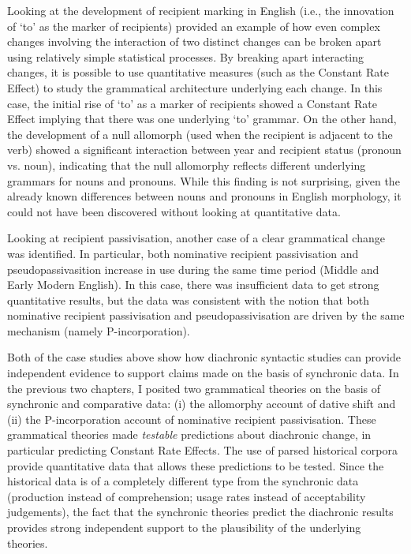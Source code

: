 	Looking at the development of recipient marking in English (i.e., the innovation of `to' as the marker of recipients) provided an example of how even complex changes involving the interaction of two distinct changes can be broken apart using relatively simple statistical processes. By breaking apart interacting changes, it is possible to use quantitative measures (such as the Constant Rate Effect) to study the grammatical architecture underlying each change. In this case, the initial rise of `to' as a marker of recipients showed a Constant Rate Effect implying that there was one underlying `to' grammar. On the other hand, the development of a null allomorph (used when the recipient is adjacent to the verb) showed a significant interaction between year and recipient status (pronoun vs. noun), indicating that the null allomorphy reflects different underlying grammars for nouns and pronouns. While this finding is not surprising, given the already known differences between nouns and pronouns in English morphology, it could not have been discovered without looking at quantitative data.
	
	Looking at recipient passivisation, another case of a clear grammatical change was identified. In particular, both nominative recipient passivisation and pseudopassivasition increase in use during the same time period (Middle and Early Modern English). In this case, there was insufficient data to get strong quantitative results, but the data was consistent with the notion that both nominative recipient passivisation and pseudopassivisation are driven by the same mechanism (namely P-incorporation).

	Both of the case studies above show how diachronic syntactic studies can provide independent evidence to support claims made on the basis of synchronic data. In the previous two chapters, I posited two grammatical theories on the basis of synchronic and comparative data: (i) the allomorphy account of dative shift and (ii) the P-incorporation account of nominative recipient passivisation. These grammatical theories made \textit{testable} predictions about diachronic change, in particular predicting Constant Rate Effects. The use of parsed historical corpora provide quantitative data that allows these predictions to be tested. Since the historical data is of a completely different type from the synchronic data (production instead of comprehension; usage rates instead of acceptability judgements), the fact that the synchronic theories predict the diachronic results provides strong independent support to the plausibility of the underlying theories.

